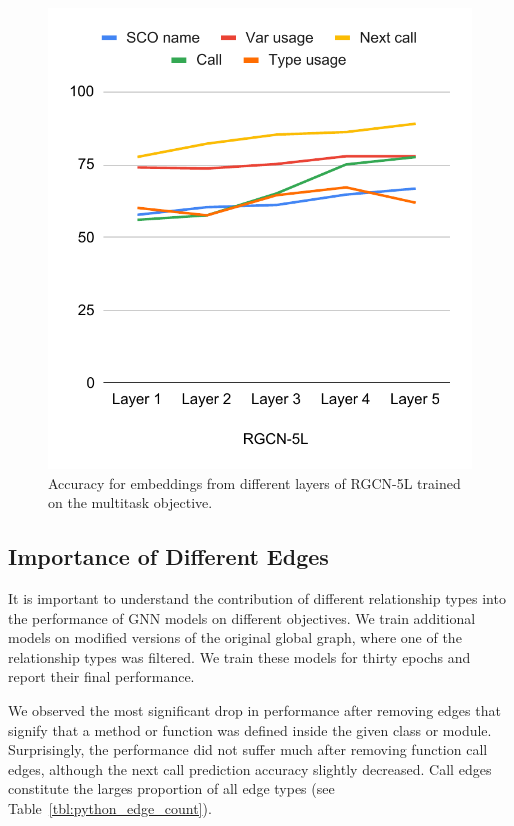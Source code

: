 \documentclass[a4paper,twoside]{article}
\begin{document}
\begin{figure}[]
    \centering
    \includegraphics[width=\columnwidth]{rgcn-5l.pdf}
    \caption{Accuracy for embeddings from different layers of RGCN-5L trained on the multitask objective.}\label{fig:rgcn_layers_5}
\end{figure}

\subsection{Importance of Different Edges}

It is important to understand the contribution of different relationship types into the performance of GNN models on different objectives. We train additional models on modified versions of the original global graph, where one of the relationship types was filtered. We train these models for thirty epochs and report their final performance. 

We observed the most significant drop in performance after removing edges that signify that a method or function was defined inside the given class or module. Surprisingly, the performance did not suffer much after removing function call edges, although the next call prediction accuracy slightly decreased. Call edges constitute the larges proportion of all edge types (see Table~\ref{tbl:python_edge_count}). 
\end{document}
